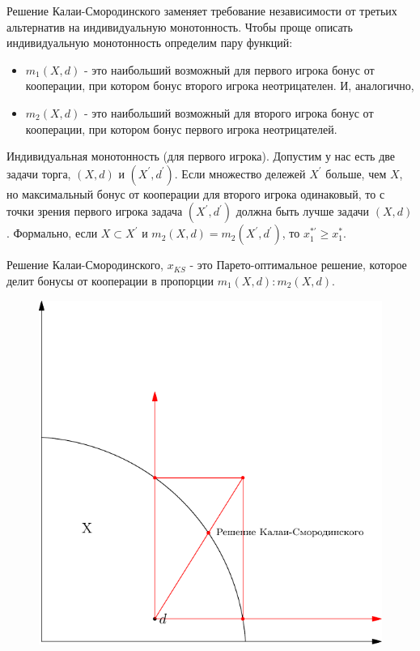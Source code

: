 Решение Калаи-Смородинского заменяет требование независимости от третьих
альтернатив на индивидуальную монотонность. Чтобы проще описать
индивидуальную монотонность определим пару функций:
\begin{itemize}
\item $m_{1}(X,d)$ - это наибольший возможный для первого игрока бонус
от кооперации, при котором бонус второго игрока неотрицателен. И,
аналогично, 
\item $m_{2}(X,d)$ - это наибольший возможный для второго игрока бонус
от кооперации, при котором бонус первого игрока неотрицателей.
\end{itemize}


 \label{imonotonicity}
Индивидуальная монотонность (для первого игрока). Допустим у нас есть
две задачи торга, $(X,d)$ и $(X^{'},d^{'})$. Если множество дележей $X^{'}$ больше, чем $X$, но максимальный бонус от кооперации для второго игрока одинаковый, то с точки зрения первого игрока задача $(X^{'},d^{'})$ должна быть лучше задачи $(X,d)$. Формально, если $X\subset X^{'}$ и $m_{2}(X,d)=m_{2}(X^{'},d^{'})$, то $x^{*'}_{1}\geq x^{*}_{1}$.


\begin{mydef}Решение Калаи-Смородинского, $x_{KS}$ - это 
Парето-оптимальное решение, которое делит бонусы от кооперации в пропорции
$m_{1}(X,d):m_{2}(X,d)$.\end{mydef}

\begin{figure}[htbp]
	\includegraphics{coop_ks.pdf}
\end{figure}


